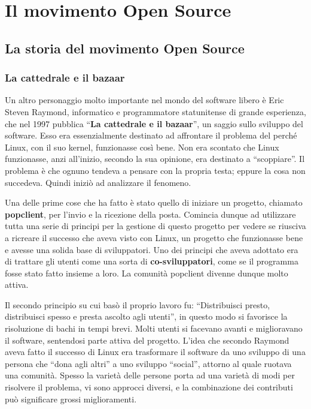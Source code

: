\chapter{Il movimento Open Source}

\section{La storia del movimento Open Source}

\subsection{La cattedrale e il bazaar}

Un altro personaggio molto importante nel mondo del software libero è Eric Steven Raymond, informatico e programmatore statunitense di grande esperienza, che nel 1997 pubblica ``\textbf{La cattedrale e il bazaar}'', un saggio sullo sviluppo del software. Esso era essenzialmente destinato ad affrontare il problema del perché Linux, con il suo kernel, funzionasse così bene. Non era scontato che Linux funzionasse, anzi all'inizio, secondo la sua opinione, era destinato a ``scoppiare''. Il problema è che ognuno tendeva a pensare con la propria testa; eppure la cosa non succedeva. Quindi iniziò ad analizzare il fenomeno. 

Una delle prime cose che ha fatto è stato quello di iniziare un progetto, chiamato \textbf{popclient}, per l'invio e la ricezione della posta. Comincia dunque ad utilizzare tutta una serie di principi per la gestione di questo progetto per vedere se riusciva a ricreare il successo che aveva visto con Linux, un progetto che funzionasse bene e avesse una solida base di sviluppatori. Uno dei principi che aveva adottato era di trattare gli utenti come una sorta di \textbf{co-sviluppatori}, come se il programma fosse stato fatto insieme a loro. La comunità popclient divenne dunque molto attiva. 

Il secondo principio su cui basò il proprio lavoro fu: ``Distribuisci presto, distribuisci spesso e presta ascolto agli utenti'', in questo modo si favorisce la risoluzione di bachi in tempi brevi. Molti utenti si facevano avanti e miglioravano il software, sentendosi parte attiva del progetto. L'idea che secondo Raymond aveva fatto il successo di Linux era trasformare il software da uno sviluppo di una persona che ``dona agli altri'' a uno sviluppo ``social'', attorno al quale ruotava una comunità. Spesso la varietà delle persone porta ad una varietà di modi per risolvere il problema, vi sono approcci diversi, e la combinazione dei contributi può significare grossi miglioramenti.

